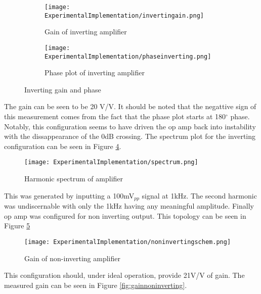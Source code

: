 \begin{figure}[H]
		\centering
		\begin{subfigure}[b]{0.45\textwidth}
			\centering
		\texttt{[image: ExperimentalImplementation/invertingain.png]}
\caption{Gain of inverting amplifier}
\label{fig:invertinggain1}
		\end{subfigure}
		\hfill
		\begin{subfigure}[b]{0.45\textwidth}
			\centering
		\texttt{[image: ExperimentalImplementation/phaseinverting.png]}
\caption{Phase plot of inverting amplifier}
\label{fig:invertingphase}
		\end{subfigure}
		\caption{Inverting gain and phase}
		\label{fig:invertinggain}
\end{figure} 




	
The gain can be seen to be 20 V/V.  It should be noted that the negattive sign of this measurement comes from the fact that the phase plot starts at 180$^\circ$ phase. Notably, this configuration seems to have driven the op amp back into instability with the dissappearance of the 0dB crossing. The spectrum plot for the inverting configuration can be seen in Figure \ref{fig:spectrum}.

		\begin{figure}[H]
	\begin{center}
		\texttt{[image: ExperimentalImplementation/spectrum.png]}
		\caption{Harmonic spectrum of amplifier}
		\label{fig:spectrum}
	\end{center}
\end{figure}

This was generated by inputting a 100mV$_{pp}$ signal at 1kHz. The second harmonic was undiscernable with only the 1kHz having any meaningful amplitude.  Finally op amp was configured for non inverting output. This topology can be seen in Figure \ref{fig:noninvertingschem}
		
						\begin{figure}[H]
			\begin{center}
				\texttt{[image: ExperimentalImplementation/noninvertingschem.png]}
				\caption{Gain of non-inverting amplifier}
				\label{fig:noninvertingschem}
			\end{center}
		\end{figure}
	
This configuration should, under ideal operation, provide 21V/V  of gain. The measured gain can be seen in Figure \ref{fig:gainnoninverting}.
		
